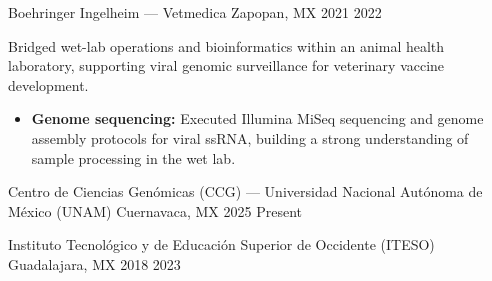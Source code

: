 \documentclass[10pt]{simplecv}
\begin{document}
    {Boehringer Ingelheim --- Vetmedica}
    {Zapopan, MX}
    {2021}
    {2022}
    {
        Bridged wet-lab operations and bioinformatics within an animal health laboratory, supporting viral genomic surveillance for veterinary vaccine development.

        \begin{itemize}[leftmargin=*]
        \setlength{\itemsep}{0cm}
            \item \textbf{Genome sequencing:} Executed Illumina MiSeq sequencing and genome assembly protocols for viral ssRNA, building a strong understanding of sample processing in the wet lab.
        \end{itemize}
    }


    {Centro de Ciencias Genómicas (CCG) --- Universidad Nacional Autónoma de México (UNAM)}
    {Cuernavaca, MX}
    {2025}
    {Present}
    {}

    {Instituto Tecnológico y de Educación Superior de Occidente (ITESO)}
    {Guadalajara, MX}
    {2018}
    {2023}
    {}
\end{document}
